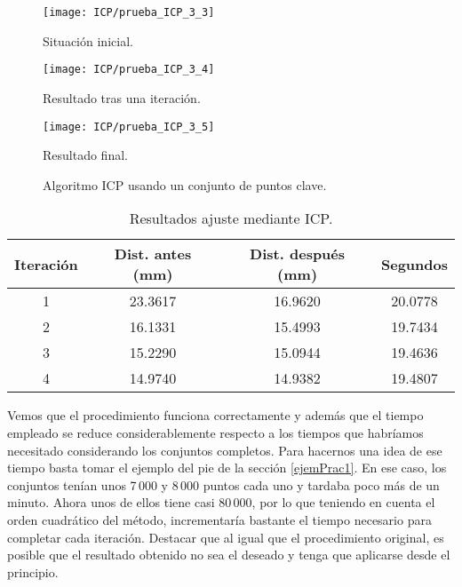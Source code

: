 \begin{figure}[h!]
	\begin{minipage}[b]{0.5\textwidth}
		\centering
		\texttt{[image: ICP/prueba\_ICP\_3\_3]} 
		\caption*{Situación inicial.}
	\end{minipage}
	\begin{minipage}[b]{0.5\textwidth}
		\centering
		\texttt{[image: ICP/prueba\_ICP\_3\_4]}
		\caption*{Resultado tras una iteración.}
	\end{minipage}
	\begin{center}
		\begin{minipage}[b]{0.5\textwidth}
		\centering
		\texttt{[image: ICP/prueba\_ICP\_3\_5]}
		\caption*{Resultado final.}
	\end{minipage}
	\end{center}

	\caption{Algoritmo ICP usando un conjunto de puntos clave.}
	\label{clave1}
\end{figure}

\begin{table}[h!]
	\centering
	\begin{tabular}{| c | c | c | c |} 
		\hline
		Iteración & Dist. antes (mm)  & Dist. después (mm) & Segundos \\
		\hline
		1 &  23.3617 &  16.9620 & 20.0778\\			 
		2 & 16.1331 & 15.4993 &   19.7434\\	
		3 & 15.2290 & 15.0944  & 19.4636\\
		4 & 14.9740 &  14.9382 & 19.4807\\
		\hline
	\end{tabular}
	\caption{Resultados ajuste mediante ICP.}
	\label{table:ICPKPtotal}
\end{table}

Vemos que el procedimiento funciona correctamente y además que el tiempo empleado se reduce considerablemente respecto a los tiempos que habríamos necesitado considerando los conjuntos completos. Para hacernos una idea de ese tiempo basta tomar el ejemplo del pie de la sección \ref{ejemPrac1}. En ese caso, los conjuntos tenían unos 7\,000 y 8\,000 puntos cada uno y tardaba poco más de un minuto. Ahora unos de ellos tiene casi 80\,000, por lo que teniendo en cuenta el orden cuadrático del método, incrementaría bastante el tiempo necesario para completar cada iteración. Destacar que al igual que el procedimiento original, es posible que el resultado obtenido no sea el deseado y tenga que aplicarse desde el principio.
